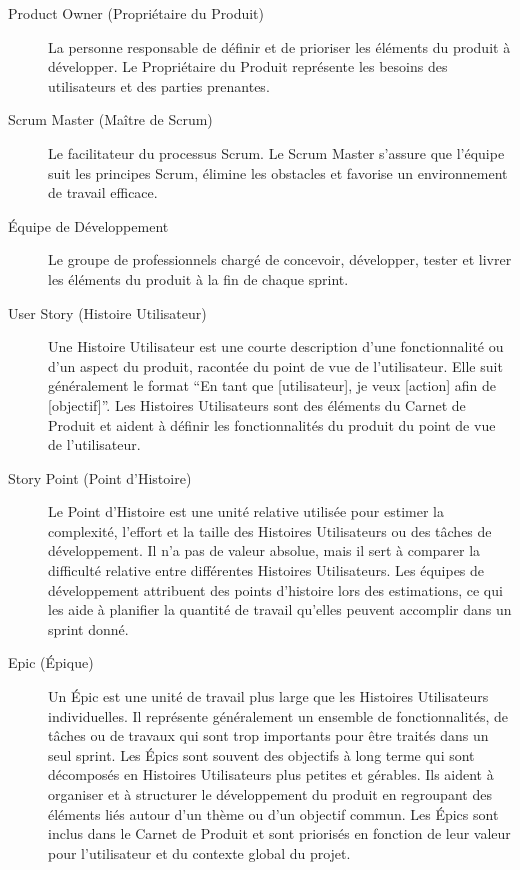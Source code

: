 \begin{description}
    \item[Product Owner (Propriétaire du Produit)] La personne responsable de définir et de prioriser les éléments du produit à développer. Le Propriétaire du Produit représente les besoins des utilisateurs et des parties prenantes.
    \item[Scrum Master (Maître de Scrum)] Le facilitateur du processus Scrum. Le Scrum Master s'assure que l'équipe suit les principes Scrum, élimine les obstacles et favorise un environnement de travail efficace.
    \item[Équipe de Développement] Le groupe de professionnels chargé de concevoir, développer, tester et livrer les éléments du produit à la fin de chaque sprint.
    \item[User Story (Histoire Utilisateur)] Une Histoire Utilisateur est une courte description d'une fonctionnalité ou d'un aspect du produit, racontée du point de vue de l'utilisateur. Elle suit généralement le format \foreignquote{french}{En tant que [utilisateur], je veux [action] afin de [objectif]}. Les Histoires Utilisateurs sont des éléments du Carnet de Produit et aident à définir les fonctionnalités du produit du point de vue de l'utilisateur.
    \item[Story Point (Point d'Histoire)] Le Point d'Histoire est une unité relative utilisée pour estimer la complexité, l'effort et la taille des Histoires Utilisateurs ou des tâches de développement. Il n'a pas de valeur absolue, mais il sert à comparer la difficulté relative entre différentes Histoires Utilisateurs. Les équipes de développement attribuent des points d'histoire lors des estimations, ce qui les aide à planifier la quantité de travail qu'elles peuvent accomplir dans un sprint donné.
    \item[Epic (Épique)] Un Épic est une unité de travail plus large que les Histoires Utilisateurs individuelles. Il représente généralement un ensemble de fonctionnalités, de tâches ou de travaux qui sont trop importants pour être traités dans un seul sprint. Les Épics sont souvent des objectifs à long terme qui sont décomposés en Histoires Utilisateurs plus petites et gérables. Ils aident à organiser et à structurer le développement du produit en regroupant des éléments liés autour d'un thème ou d'un objectif commun. Les Épics sont inclus dans le Carnet de Produit et sont priorisés en fonction de leur valeur pour l'utilisateur et du contexte global du projet.
\end{description}

